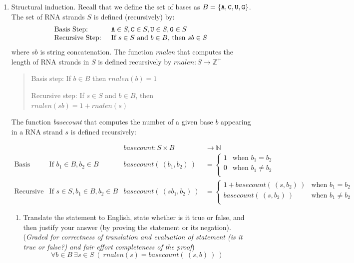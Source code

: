 \begin{enumerate}[labelindent=0pt, leftmargin=0pt]
\begin{enumerate}
    \end{enumerate}
    
    \item Structural induction. Recall that we define the set of bases as $B  =  \{ \texttt{A}, \texttt{C}, \texttt{U}, \texttt{G} \}$.
The set of RNA strands $S$ is defined (recursively) by:
\[
\begin{array}{ll}
\textrm{Basis Step: } & \texttt{A} \in S, \texttt{C} \in S, \texttt{U} \in S, \texttt{G} \in S \\
\textrm{Recursive Step: } & \textrm{If } s \in S\textrm{ and }b \in B \textrm{, then }sb \in S
\end{array}
\]
where $sb$ is string concatenation. 
The function \textit{rnalen} that computes the length of RNA strands in $S$ is defined recursively by
$rnalen: S  \to \mathbb{Z}^+$


\begin{quote}
Basis step: If $b \in B$ then $rnalen(b)  = 1$

Recursive step: If $s \in S$ and $b \in B$, then $rnalen(sb)  = 1 + rnalen(s)$
\end{quote}

The function \textit{basecount} that computes the number of a given base 
$b$ appearing in a RNA strand $s$ is defined recursively:
    
\[
\begin{array}{llll}
& & \textit{basecount} : S \times B & \to \mathbb{N} \\
\textrm{Basis Step:} &  \textrm{If } b_1 \in B, b_2 \in B & \textit{basecount}(~(b_1, b_2)~) & =
        \begin{cases}
            1 & \textrm{when } b_1 = b_2 \\
            0 & \textrm{when } b_1 \neq b_2 \\
        \end{cases} \\
\textrm{Recursive Step:} & \textrm{If } s \in S, b_1 \in B, b_2 \in B &\textit{basecount}(~(s b_1, b_2)~) & =
        \begin{cases}
            1 + \textit{basecount}(~(s, b_2)~) & \textrm{when } b_1 = b_2 \\
            \textit{basecount}(~(s, b_2)~) & \textrm{when } b_1 \neq b_2 \\
        \end{cases}
\end{array}
\]
\begin{enumerate}
\item 
Translate the statement to English, state whether is it true or false, and then justify your answer (by proving the statement or its negation).
({\it Graded for correctness of translation and evaluation of statement (is it true or false?) 
    and fair effort completeness of the proof}) 
$$\forall b \in B ~\exists s \in S ~(~rnalen(s) = basecount(~(s,b)~)~)$$


\end{enumerate}
\end{enumerate}
